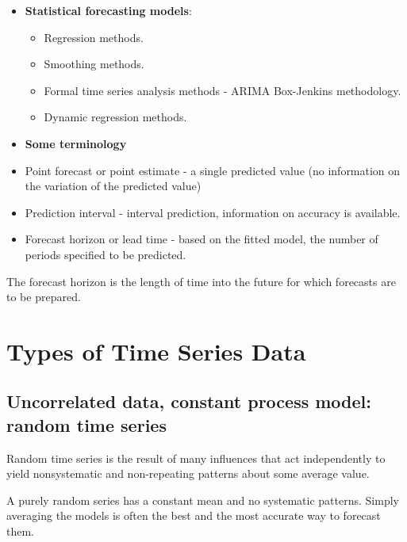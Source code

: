 \documentclass[
]{book}
\begin{document}
\begin{itemize}
\item
  \textbf{Statistical forecasting models}:

  \begin{itemize}
  \item
    Regression methods.
  \item
    Smoothing methods.
  \item
    Formal time series analysis methods - ARIMA Box-Jenkins methodology.
  \item
    Dynamic regression methods.
  \end{itemize}
\item
  \textbf{Some terminology}
\item
  Point forecast or point estimate - a single predicted value (no information on the variation of the predicted value)
\item
  Prediction interval - interval prediction, information on accuracy is available.
\item
  Forecast horizon or lead time - based on the fitted model, the number of periods specified to be predicted.
\end{itemize}

The forecast horizon is the length of time into the future for which forecasts are to be prepared.

\hypertarget{types-of-time-series-data}{%
\section{Types of Time Series Data}\label{types-of-time-series-data}}

\hypertarget{uncorrelated-data-constant-process-model-random-time-series}{%
\subsection{Uncorrelated data, constant process model: random time series}\label{uncorrelated-data-constant-process-model-random-time-series}}

Random time series is the result of many influences that act independently to yield nonsystematic and non-repeating patterns about some average value.

A purely random series has a constant mean and no systematic patterns. Simply averaging the models is often the best and the most accurate way to forecast them.
\end{document}
